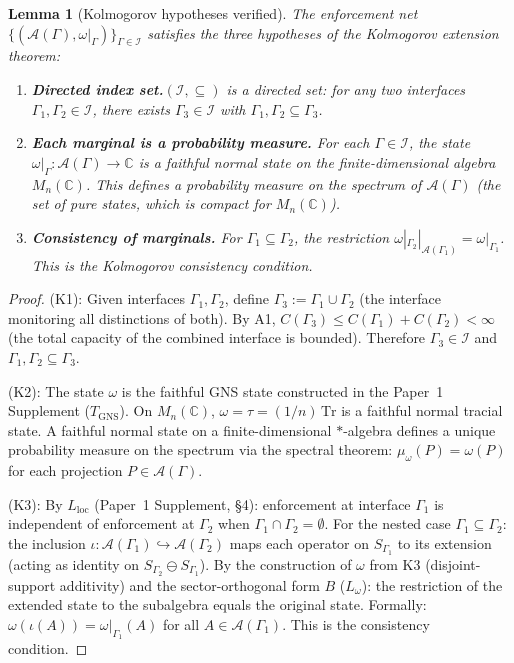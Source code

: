 \documentclass[11pt,a4paper]{article}
\newtheorem{lemma}[theorem]{Lemma}
\theoremstyle{definition}
\begin{document}
\begin{lemma}[Kolmogorov hypotheses verified]\label{lem:kolmogorov_hyp}
The enforcement net
$\{(\mathcal{A}(\Gamma), \omega|_\Gamma)\}_{\Gamma \in \mathcal{I}}$
satisfies the three hypotheses of the Kolmogorov extension theorem:
\begin{enumerate}[label=(K\arabic*),nosep]
  \item \textbf{Directed index set.}\quad $(\mathcal{I}, \subseteq)$
  is a directed set: for any two interfaces $\Gamma_1, \Gamma_2 \in
  \mathcal{I}$, there exists $\Gamma_3 \in \mathcal{I}$ with
  $\Gamma_1, \Gamma_2 \subseteq \Gamma_3$.
  \item \textbf{Each marginal is a probability measure.}\quad
  For each $\Gamma \in \mathcal{I}$, the state
  $\omega|_\Gamma: \mathcal{A}(\Gamma) \to \mathbb{C}$ is a
  faithful normal state on the finite-dimensional algebra
  $M_n(\mathbb{C})$.  This defines a probability measure on the
  spectrum of $\mathcal{A}(\Gamma)$ (the set of pure states, which
  is compact for $M_n(\mathbb{C})$).
  \item \textbf{Consistency of marginals.}\quad
  For $\Gamma_1 \subseteq \Gamma_2$, the restriction
  $\omega|_{\Gamma_2}|_{\mathcal{A}(\Gamma_1)} = \omega|_{\Gamma_1}$.
  This is the Kolmogorov consistency condition.
\end{enumerate}
\end{lemma}

\begin{proof}
(K1): Given interfaces $\Gamma_1, \Gamma_2$, define $\Gamma_3 :=
\Gamma_1 \cup \Gamma_2$ (the interface monitoring all distinctions of
both).  By A1, $C(\Gamma_3) \le C(\Gamma_1) + C(\Gamma_2) < \infty$
(the total capacity of the combined interface is bounded).  Therefore
$\Gamma_3 \in \mathcal{I}$ and $\Gamma_1, \Gamma_2 \subseteq \Gamma_3$.

(K2): The state $\omega$ is the faithful GNS state constructed in the
Paper~1 Supplement ($T_{\mathrm{GNS}}$).  On $M_n(\mathbb{C})$,
$\omega = \tau = (1/n)\,\mathrm{Tr}$ is a faithful normal tracial
state.  A faithful normal state on a finite-dimensional $*$-algebra
defines a unique probability measure on the spectrum via the spectral
theorem: $\mu_\omega(P) = \omega(P)$ for each projection
$P \in \mathcal{A}(\Gamma)$.

(K3): By $L_{\mathrm{loc}}$ (Paper~1 Supplement, \S4): enforcement at
interface $\Gamma_1$ is independent of enforcement at $\Gamma_2$ when
$\Gamma_1 \cap \Gamma_2 = \emptyset$.  For the nested case
$\Gamma_1 \subseteq \Gamma_2$: the inclusion
$\iota: \mathcal{A}(\Gamma_1) \hookrightarrow \mathcal{A}(\Gamma_2)$
maps each operator on $S_{\Gamma_1}$ to its extension (acting as
identity on $S_{\Gamma_2} \ominus S_{\Gamma_1}$).  By the
construction of $\omega$ from K3 (disjoint-support additivity) and
the sector-orthogonal form $B$ ($L_\omega$): the restriction of the
extended state to the subalgebra equals the original state.  Formally:
$\omega(\iota(A)) = \omega|_{\Gamma_1}(A)$ for all
$A \in \mathcal{A}(\Gamma_1)$.  This is the consistency condition.
\end{proof}
\end{document}
